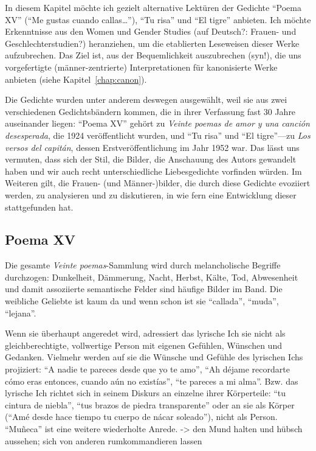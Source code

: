 In diesem Kapitel möchte ich gezielt alternative Lektüren der Gedichte ``Poema XV'' (``Me gustas cuando callas\ldots''), ``Tu risa'' und ``El tigre'' anbieten. 
Ich möchte Erkenntnisse aus den Women und Gender Studies (auf Deutsch?: Frauen- und Geschlechterstudien?) heranziehen, um die etablierten Leseweisen dieser Werke aufzubrechen.
Das Ziel ist, aus der Bequemlichkeit auszubrechen (syn!), die uns vorgefertigte (männer-zentrierte) Interpretationen für kanonisierte Werke anbieten (siehe Kapitel~\ref{chap:canon}).

Die Gedichte wurden unter anderem deswegen ausgewählt, weil sie aus zwei verschiedenen Gedichtsbändern kommen, die in ihrer Verfassung fast 30 Jahre auseinander liegen:
``Poema XV'' gehört zu \textit{Veinte poemas de amor y una canción desesperada}, die 1924 veröffentlicht wurden, und ``Tu risa'' und ``El tigre''—zu \textit{Los versos del capitán}, dessen Erstveröffentlichung im Jahr 1952 war.
Das lässt uns vermuten, dass sich der Stil, die Bilder, die Anschauung des Autors gewandelt haben und wir auch recht unterschiedliche Liebesgedichte vorfinden würden.
Im Weiteren gilt, die Frauen- (und Männer-)bilder, die durch diese Gedichte evoziiert werden, zu analysieren und zu diskutieren, in wie fern eine Entwicklung dieser stattgefunden hat.

\subsection{Poema XV}
Die gesamte \textit{Veinte poemas}-Sammlung wird durch melancholische Begriffe durchzogen:
Dunkelheit, Dämmerung, Nacht, Herbst, Kälte, Tod, Abwesenheit und damit assoziierte semantische Felder sind häufige Bilder im Band.
Die weibliche Geliebte ist kaum da und wenn schon ist sie ``callada'', ``muda'', ``lejana''.

Wenn sie überhaupt angeredet wird, adressiert das lyrische Ich sie nicht als gleichberechtigte, vollwertige Person mit eigenen Gefühlen, Wünschen und Gedanken.
Vielmehr werden auf sie die Wünsche und Gefühle des lyrischen Ichs projiziert:
``A nadie te pareces desde que yo te amo'', ``Ah déjame recordarte cómo eras entonces, cuando aún no existías'', ``te pareces a mi alma''.
Bzw. das lyrische Ich richtet sich in seinem Diskurs an einzelne ihrer Körperteile: ``tu cintura de niebla'', ``tus brazos de piedra transparente'' oder an sie als Körper (``Amé desde hace tiempo tu cuerpo de nácar soleado''), nicht als Person. %
``Muñeca'' ist eine weitere wiederholte Anrede. -> den Mund halten und hübsch aussehen; sich von anderen rumkommandieren lassen

